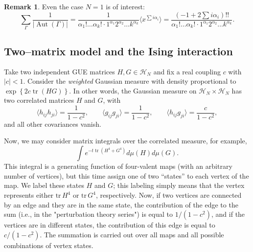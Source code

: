 \documentclass[letterpaper,11pt,oneside,reqno]{book}
\numberwithin{equation}{chapter}  %
\theoremstyle{definition}
\newtheorem{remark}[proposition]{Remark}
\begin{document}
\begin{remark}
	Even the case $N=1$ is of interest:
	\begin{equation*}
		\sum_{\Gamma}\frac{1}{|\operatorname{Aut}(\Gamma)|}
		=
		\frac{1}{\alpha_1!\ldots \alpha_k!\cdot 1^{\alpha_1}2^{\alpha_2}\ldots k^{\alpha_k}}
		\langle x^{\sum i\alpha_i} \rangle =
		\frac{\left( -1+2\sum i\alpha_i \right)!!}
		{\alpha_1!\ldots \alpha_k!\cdot 1^{\alpha_1}2^{\alpha_2}\ldots k^{\alpha_k}}.
	\end{equation*}
\end{remark}


\subsection{Two–matrix model and the Ising interaction}
\label{lecture15:subsec:ising}

Take two independent GUE matrices
$H,G\in\mathcal H_N$ and fix a real coupling $c$ with
$|c|<1$.
Consider the \emph{weighted} Gaussian measure with density proportional
to $\exp\left\{ 2c \operatorname{tr}(HG) \right\}$.
In other words, the  Gaussian measure on $\mathcal{H}_N\times\mathcal{H}_N$
has two correlated matrices $H$ and $G$, with
\begin{equation*}
	\langle h_{ij}h_{ji} \rangle =\frac{1}{1-c^2},\qquad
	\langle g_{ij}g_{ji} \rangle =\frac{1}{1-c^2},\qquad
	\langle h_{ij}g_{ji} \rangle =\frac{c}{1-c^2},
\end{equation*}
and all other covariances vanish.

Now, we may consider matrix integrals over the correlated measure, for example,
\begin{equation*}
	\int e^{-t\operatorname{tr}\left( H^4+G^4 \right)}d\mu(H)d\mu(G).
\end{equation*}
This integral is a generating function of four-valent maps (with an arbitrary number of vertices), but this time assign one of two ``states'' to each vertex of the map. We label these states $H$ and $G$; this labeling simply means that the vertex represents either $\text{tr}\, H^4$ or $\text{tr}\, G^4$, respectively. Now, if two vertices are connected by an edge and they are in the same state, the contribution of the edge to the sum (i.e., in the "perturbation theory series") is equal to $1 / (1 - c^2)$, and if the vertices are in different states, the contribution of this edge is equal to $c / (1 - c^2)$. The summation is carried out over all maps and all possible combinations of vertex states.
\end{document}
